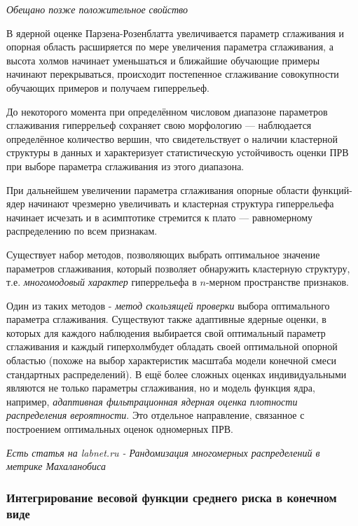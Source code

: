 \documentclass{article}
\numberwithin{equation}{subsection}
\begin{document}
\begin{myquote}
    \textit{Обещано позже положительное свойство}
\end{myquote}

В ядерной оценке Парзена-Розенблатта увеличивается параметр сглаживания и опорная область
расширяется по мере увеличения параметра сглаживания, а высота \glqq холмов\grqq
начинает уменьшаться и ближайшие обучающие примеры начинают перекрываться, происходит
постепенное сглаживание совокупности обучающих примеров и получаем \glqq гиперрельеф\grqq.

До некоторого момента при определённом числовом диапазоне параметров 
сглаживания гиперрельеф сохраняет свою морфологию --- наблюдается определённое количество
вершин, что свидетельствует о наличии кластерной структуры в данных и характеризует
статистическую устойчивость оценки ПРВ при выборе параметра сглаживания из этого диапазона.

При дальнейшем увеличении параметра сглаживания опорные области функций-ядер начинают
чрезмерно увеличивать и кластерная структура гиперрельефа начинает
исчезать и в асимптотике стремится к плато --- равномерному распределению 
по всем признакам.

Существует набор методов, позволяющих выбрать оптимальное значение параметров сглаживания,
который позволяет обнаружить кластерную структуру, т.е. \textit{многомодовый характер} 
гиперрельефа в $n$-мерном пространстве признаков.

Один из таких методов - \textit{метод скользящей проверки} выбора оптимального параметра
сглаживания. Существуют также адаптивные ядерные оценки, в которых для каждого наблюдения
выбирается свой оптимальный параметр сглаживания и каждый \glqq гиперхолм\grqq будет
обладать своей оптимальной опорной областью (похоже на выбор характеристик масштаба 
модели конечной смеси стандартных распределений).
В ещё более сложных оценках индивидуальными являются не только параметры сглаживания,
но и модель функция ядра, например, \textit{адаптивная фильтрационная ядерная оценка
плотности распределения вероятности}. Это отдельное направление, связанное с 
построением оптимальных оценок одномерных ПРВ.

\begin{myquote}
    \textit{Есть статья на labnet.ru - Рандомизация многомерных распределений в метрике
    Махаланобиса}
\end{myquote}




\subsubsection{Интегрирование весовой функции среднего риска в конечном виде}
\end{document}
